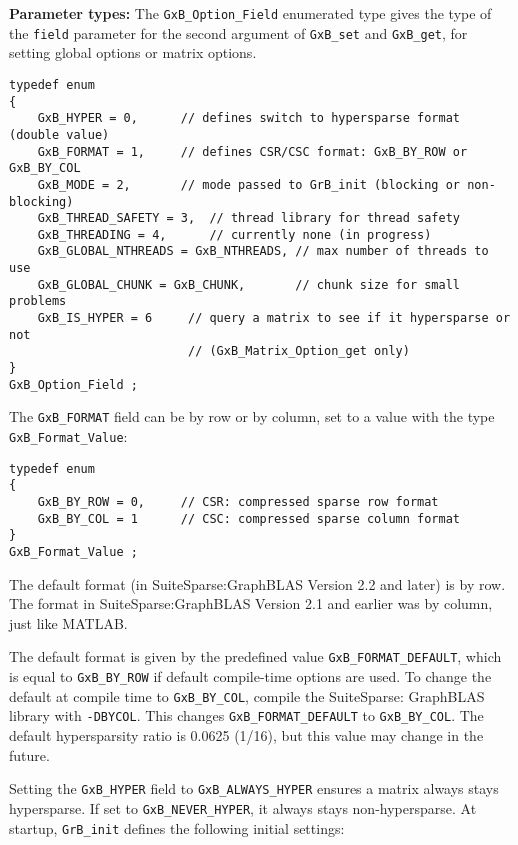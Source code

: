 \documentclass[12pt]{article}
\begin{document}
{\bf Parameter types:}
The \verb'GxB_Option_Field' enumerated type gives the type of the \verb'field'
parameter for the second argument of \verb'GxB_set' and \verb'GxB_get',
for setting global options or matrix options.

{\footnotesize
\begin{verbatim}
typedef enum
{
    GxB_HYPER = 0,      // defines switch to hypersparse format (double value)
    GxB_FORMAT = 1,     // defines CSR/CSC format: GxB_BY_ROW or GxB_BY_COL
    GxB_MODE = 2,       // mode passed to GrB_init (blocking or non-blocking)
    GxB_THREAD_SAFETY = 3,  // thread library for thread safety
    GxB_THREADING = 4,      // currently none (in progress)
    GxB_GLOBAL_NTHREADS = GxB_NTHREADS, // max number of threads to use
    GxB_GLOBAL_CHUNK = GxB_CHUNK,       // chunk size for small problems
    GxB_IS_HYPER = 6     // query a matrix to see if it hypersparse or not
                         // (GxB_Matrix_Option_get only)
}
GxB_Option_Field ;
\end{verbatim} }

The \verb'GxB_FORMAT' field can be by row or by column, set to a value
with the type \verb'GxB_Format_Value':

{\footnotesize
\begin{verbatim}
typedef enum
{
    GxB_BY_ROW = 0,     // CSR: compressed sparse row format
    GxB_BY_COL = 1      // CSC: compressed sparse column format
}
GxB_Format_Value ;
\end{verbatim} }

The default format (in SuiteSparse:GraphBLAS Version 2.2 and later) is by row.
The format in SuiteSparse:GraphBLAS Version 2.1 and earlier was by column,
just like MATLAB.

The default format is given by the predefined value \verb'GxB_FORMAT_DEFAULT',
which is equal to \verb'GxB_BY_ROW' if default compile-time options are used.
To change the default at compile time to \verb'GxB_BY_COL', compile the
SuiteSparse: GraphBLAS library with \verb'-DBYCOL'.  This changes
\verb'GxB_FORMAT_DEFAULT' to \verb'GxB_BY_COL'.  The default hypersparsity
ratio is 0.0625 (1/16), but this value may change in the future.

Setting the \verb'GxB_HYPER' field to \verb'GxB_ALWAYS_HYPER' ensures a matrix
always stays hypersparse.  If set to \verb'GxB_NEVER_HYPER', it always stays
non-hypersparse.  At startup, \verb'GrB_init' defines the following initial
settings:
\end{document}
